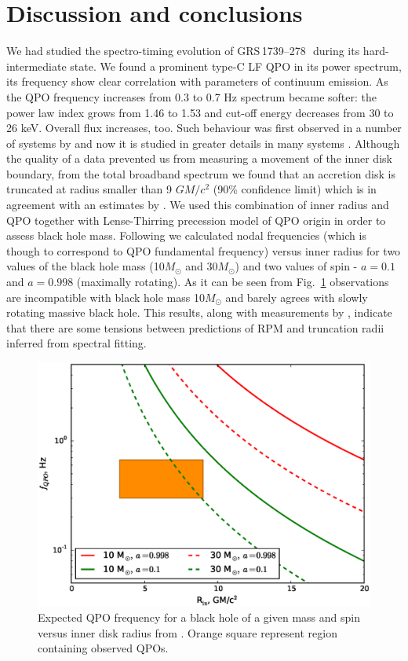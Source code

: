 \documentclass[a4paper,fleqn,usenatbib]{mnras}
\def\grs{{GRS\,1739--278\,}}
\begin{document}
\section{Discussion and conclusions}
We had studied the spectro-timing evolution of \grs\, during its hard-intermediate state.  
We found a prominent type-C LF QPO in its power spectrum, its frequency show clear correlation with parameters of continuum emission. 
As the QPO frequency increases from 0.3 to 0.7 Hz spectrum became softer: the power law index grows from 1.46 to 1.53 and cut-off energy decreases from 30 to 26 keV. 
Overall flux increases, too. 
Such behaviour was first observed in a number of systems by \citet{dimatteo99} and now it is studied in greater details in many systems \citep[see e.g.][ and many more]{vignarca03,stiele13,seifina14,fuerst16_gx339}. 
Although the quality of a data prevented us from measuring a movement of the inner disk boundary, from the total broadband spectrum we found that an accretion disk is truncated at radius smaller than 9 $GM/c^{2}$ (90\% confidence limit) which is in agreement with an estimates by \citet{miller15_nust}. 
We used this combination of inner radius and QPO together with Lense-Thirring precession model of QPO origin \citep{ingram09} in order to assess black hole mass. 
Following \citet{ingram14} we calculated nodal frequencies (which is though to correspond to QPO fundamental frequency) versus inner radius for two values of the black hole mass (10$M_{\odot}$ and 30$M_{\odot}$) and two values of spin - $a=0.1$ and $a=0.998$ (maximally rotating). 
As it can be seen from Fig.~\ref{fig:qpoconstr} observations are incompatible with black hole mass 10$M_{\odot}$ and barely agrees with slowly rotating massive black hole. 
This results, along with measurements by \cite{fuerst16_gx339}, indicate that there are some tensions between predictions of RPM and truncation radii inferred from spectral fitting.

\begin{figure}
        \includegraphics[width=\columnwidth]{qpoconstr_v03.eps}
        \caption{Expected QPO frequency for a black hole of a given mass and spin versus inner disk radius from \protect\cite{ingram14}. Orange square represent region containing observed QPOs.}
        \label{fig:qpoconstr}
\end{figure}
\end{document}
